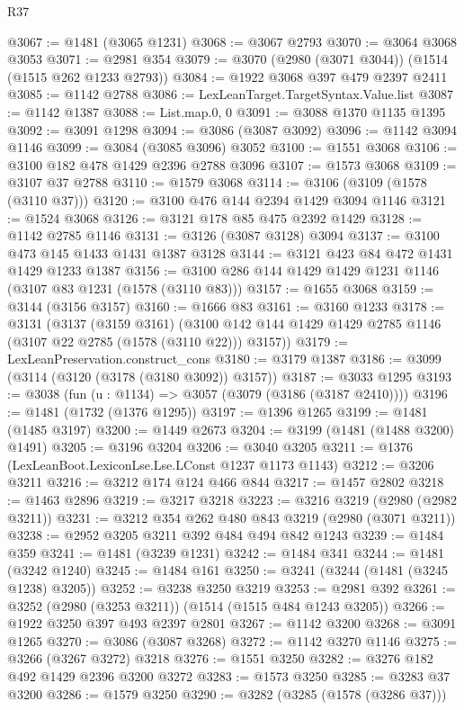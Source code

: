 \begin{lexlean}{R37}
\begin{coremodule}
@3067 := @1481 (@3065 @1231)
@3068 := @3067 @2793
@3070 := @3064 @3068 @3053
@3071 := @2981 @354
@3079 := @3070 (@2980 (@3071 @3044)) (@1514 (@1515 @262 @1233 @2793))
@3084 := @1922 @3068 @397 @479 @2397 @2411
@3085 := @1142 @2788
@3086 := LexLeanTarget.TargetSyntax.Value.list
@3087 := @1142 @1387
@3088 := List.map.{0, 0}
@3091 := @3088 @1370 @1135 @1395
@3092 := @3091 @1298
@3094 := @3086 (@3087 @3092)
@3096 := @1142 @3094 @1146
@3099 := @3084 (@3085 @3096) @3052
@3100 := @1551 @3068
@3106 := @3100 @182 @478 @1429 @2396 @2788 @3096
@3107 := @1573 @3068
@3109 := @3107 @37 @2788
@3110 := @1579 @3068
@3114 := @3106 (@3109 (@1578 (@3110 @37)))
@3120 := @3100 @476 @144 @2394 @1429 @3094 @1146
@3121 := @1524 @3068
@3126 := @3121 @178 @85 @475 @2392 @1429
@3128 := @1142 @2785 @1146
@3131 := @3126 (@3087 @3128) @3094
@3137 := @3100 @473 @145 @1433 @1431 @1387 @3128
@3144 := @3121 @423 @84 @472 @1431 @1429 @1233 @1387
@3156 := @3100 @286 @144 @1429 @1429 @1231 @1146 (@3107 @83 @1231 (@1578 (@3110 @83)))
@3157 := @1655 @3068
@3159 := @3144 (@3156 @3157)
@3160 := @1666 @83
@3161 := @3160 @1233
@3178 := @3131
    (@3137
      (@3159 @3161)
      (@3100 @142 @144 @1429 @1429 @2785 @1146 (@3107 @22 @2785 (@1578 (@3110 @22))) @3157))
@3179 := LexLeanPreservation.construct_cons
@3180 := @3179 @1387
@3186 := @3099 (@3114 (@3120 (@3178 (@3180 @3092)) @3157))
@3187 := @3033 @1295
@3193 := @3038 (fun (u : @1134) => @3057 (@3079 (@3186 (@3187 @2410))))
@3196 := @1481 (@1732 (@1376 @1295))
@3197 := @1396 @1265
@3199 := @1481 (@1485 @3197)
@3200 := @1449 @2673
@3204 := @3199 (@1481 (@1488 @3200) @1491)
@3205 := @3196 @3204
@3206 := @3040 @3205
@3211 := @1376 (LexLeanBoot.LexiconLse.Lse.LConst @1237 @1173 @1143)
@3212 := @3206 @3211
@3216 := @3212 @174 @124 @466 @844
@3217 := @1457 @2802
@3218 := @1463 @2896
@3219 := @3217 @3218
@3223 := @3216 @3219 (@2980 (@2982 @3211))
@3231 := @3212 @354 @262 @480 @843 @3219 (@2980 (@3071 @3211))
@3238 := @2952 @3205 @3211 @392 @484 @494 @842 @1243
@3239 := @1484 @359
@3241 := @1481 (@3239 @1231)
@3242 := @1484 @341
@3244 := @1481 (@3242 @1240)
@3245 := @1484 @161
@3250 := @3241 (@3244 (@1481 (@3245 @1238) @3205))
@3252 := @3238 @3250 @3219
@3253 := @2981 @392
@3261 := @3252 (@2980 (@3253 @3211)) (@1514 (@1515 @484 @1243 @3205))
@3266 := @1922 @3250 @397 @493 @2397 @2801
@3267 := @1142 @3200
@3268 := @3091 @1265
@3270 := @3086 (@3087 @3268)
@3272 := @1142 @3270 @1146
@3275 := @3266 (@3267 @3272) @3218
@3276 := @1551 @3250
@3282 := @3276 @182 @492 @1429 @2396 @3200 @3272
@3283 := @1573 @3250
@3285 := @3283 @37 @3200
@3286 := @1579 @3250
@3290 := @3282 (@3285 (@1578 (@3286 @37)))

\end{coremodule}
\end{lexlean}
